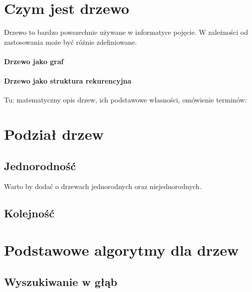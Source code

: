 \section{Czym jest drzewo}
Drzewo to bardzo powszechnie używane w informatyce pojęcie. W zależności od zastosowania może być różnie zdefiniowane.

\paragraph{Drzewo jako graf}
\paragraph{Drzewo jako struktura rekurencyjna}


Tu: matematyczny opis drzew, ich podstawowe własności, omówienie terminów:
\begin{description}
    \item
    \item[drzewo]
    \item[las]
    \item[rodzic]
    \item[przodek]
    \item[korzeń]
    \item[dziecko]
    \item[potomek]
    \item[głębokość, mini]
\end{description}

\section{Podział drzew}
\subsection{Jednorodność}
Warto by dodać o drzewach jednorodnych oraz niejednorodnych.

\subsection{Kolejność}


\section{Podstawowe algorytmy dla drzew}
\subsection{Wyszukiwanie w głąb}
